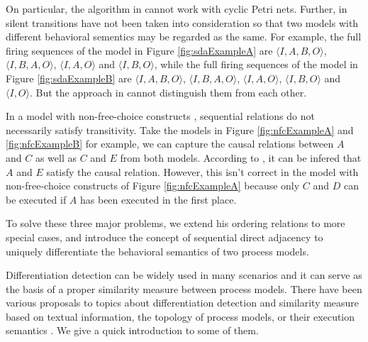 \documentclass{llncs}
\begin{document}
On particular, the algorithm in \cite{jin2014computing} cannot work with cyclic Petri nets. Further, in \cite{jin2014computing} silent transitions have not been taken into consideration so that two models with different behavioral sementics may be regarded as the same. For example, the full firing sequences of the model in Figure \ref{fig:sdaExampleA} are $\langle I,A,B,O\rangle$, $\langle I,B,A,O\rangle$, $\langle I,A,O\rangle$ and $\langle I,B,O\rangle$, while the full firing sequences of the model in Figure \ref{fig:sdaExampleB} are $\langle I,A,B,O\rangle$, $\langle I,B,A,O\rangle$, $\langle I,A,O\rangle$, $\langle I,B,O\rangle$ and $\langle I,O\rangle$. But the approach in \cite{jin2014computing} cannot distinguish them from each other.

In a model with non-free-choice constructs \cite{de2003workflow}, sequential relations do not necessarily satisfy transitivity. Take the models in Figure \ref{fig:nfcExampleA} and \ref{fig:nfcExampleB} for example, we can capture the causal relations between $A$ and $C$ as well as $C$ and $E$ from both models. According to \cite{jin2014computing}, it can be infered that $A$ and $E$ satisfy the causal relation. However, this isn't correct in the model with non-free-choice constructs of Figure \ref{fig:nfcExampleA} because only $C$ and $D$ can be executed if $A$ has been executed in the first place.

To solve these three major problems, we extend his ordering relations to more special cases, and introduce the concept of sequential direct adjacency to uniquely differentiate the behavioral semantics of two process models. %

Differentiation detection can be widely used in many scenarios and it can serve as the basis of a proper similarity measure between process models. There have been various proposals to topics about differentiation detection and similarity measure based on textual information, the topology of process models, or their execution semantics \cite{weidlich2011efficient}. We give a quick introduction to some of them.
\end{document}
